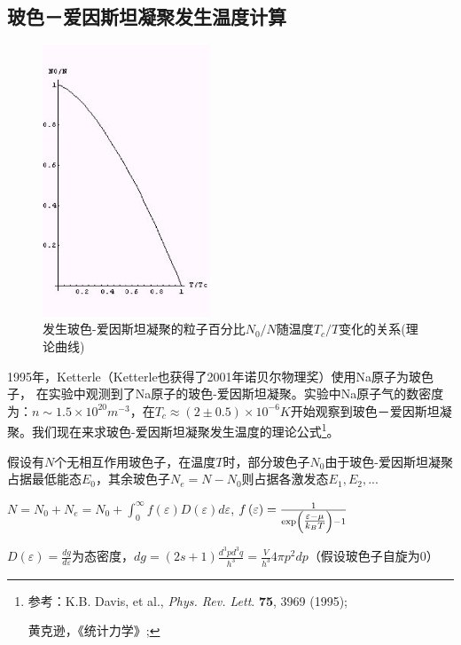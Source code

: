 \subsection{玻色－爱因斯坦凝聚发生温度计算}


\begin{figure}[h]
\begin{center}
\includegraphics[clip,width=5cm]{IdenticalParticles/31-3.ps}
\caption{发生玻色-爱因斯坦凝聚的粒子百分比$N_0 / N$随温度$T_c /
T$变化的关系(理论曲线)}
\end{center}
\end{figure}


1995年，Ketterle（Ketterle也获得了2001年诺贝尔物理奖）使用Na原子为玻色子，
在实验中观测到了Na原子的玻色-爱因斯坦凝聚。实验中Na原子气的数密度为：$n \sim 1.5 \times 10^{20} m^{ - 3} $，在$T_c  \approx \left( {2 \pm 0.5} \right) \times 10^{ - 6} K$开始观察到玻色－爱因斯坦凝聚。我们现在来求玻色-爱因斯坦凝聚发生温度的理论公式\footnote{参考：K.B. Davis, et al., \emph{Phys. Rev. Lett}. \textbf{75}, 3969 (1995);

黄克逊，《统计力学》;}。

假设有$N$个无相互作用玻色子，在温度$T$时，部分玻色子$N_0$由于玻色-爱因斯坦凝聚占据最低能态$E_0$，其余玻色子$N_e  = N - N_0 $则占据各激发态$E_1 ,E_2 ,...$

$N = N_0  + N_e  = N_0  + \int_0^\infty  {f\left( \varepsilon  \right)D\left( \varepsilon  \right)d\varepsilon } $, $f\left( \varepsilon  \right) = \frac{1}{{\exp \left( {{\textstyle{{\varepsilon  - \mu } \over {k_B T}}}} \right) - 1}}$


$D\left( \varepsilon  \right) = \frac{{dg}}{{d\varepsilon }}$为态密度，$dg = \left( {2s + 1} \right)\frac{{d^3 pd^3 q}}{{h^3 }} = \frac{V}{{h^3 }}4\pi p^2 dp$（假设玻色子自旋为0）

